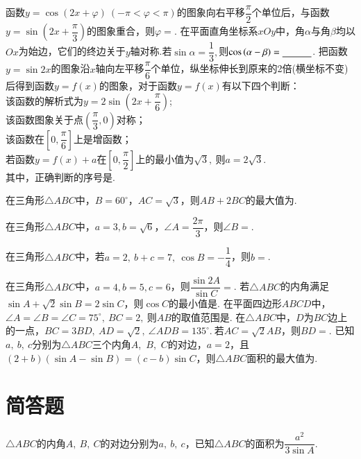 \documentclass{BHCexam}
\begin{document}
\begin{questions}
\qs 函数$y=\cos (2x+\varphi)~(-\pi<\varphi<\pi)$的图象向右平移$\dfrac{\pi}{2}$个单位后，与函数$y=\sin (2x+\dfrac{\pi}{3})$的图象重合，则$\varphi=$\tk.
\qs 在平面直角坐标系$xOy$中，角$ \alpha $与角$ \beta $均以$ Ox $为始边，它们的终边关于$y$轴对称.若$ \sin \alpha=\dfrac{1}{3}, $则$ \cos\left(\alpha-\beta\right)=\underline{\hspace{3em}} $.
\qs 把函数$ y=\sin 2x $的图象沿$x$轴向左平移$ \dfrac{\pi}{6} $个单位，纵坐标伸长到原来的2倍(横坐标不变)后得到函数$ y=f(x) $的图象，对于函数$ y=f(x) $有以下四个判断：\\
 该函数的解析式为$ y=2\sin \left(2x+\dfrac{\pi}{6}\right) $;\\
 该函数图象关于点$ \left(\dfrac{\pi}{3},0\right) $对称；\\
 该函数在$ \left[0,\dfrac{\pi}{6}\right] $上是增函数；\\
 若函数$ y=f(x)+a $在$ \left[0,\dfrac{\pi}{2}\right] $上的最小值为$ \sqrt{3},~ $则$ a=2\sqrt{3} .$\\
其中，正确判断的序号是\tk.




\qs 在三角形$\triangle ABC$中，$ B=60^{\circ} $，$ AC=\sqrt{3} $，则$ AB+2BC $的最大值为\tk.


\qs 在三角形$\triangle ABC$中，$ a=3,b=\sqrt{6} $，$ \angle A=\dfrac{2\pi}{3} $，则$ \angle B= $\tk.

\qs 在三角形$\triangle ABC$中，若$ a=2,~b+c=7,~\cos B=-\dfrac{1}{4} $，则$ b= $\tk.

\qs 在三角形$\triangle ABC$中，$ a=4,b=5,c=6 $，则$ \dfrac{\sin 2A}{\sin C}=$\tk.
\qs 若$\triangle ABC$的内角满足$ \sin A+\sqrt{2}\sin B=2\sin C $，则$ \cos C $的最小值是\tk.
\question 在平面四边形$ABCD$中，$\angle A=\angle B=\angle C=75^{\circ},~$$ BC=2,~ $则$AB$的取值范围是\tk.
\qs 在$\triangle ABC$中，$ D $为$ BC $边上的一点，$ BC=3BD,~AD=\sqrt{2},~\angle ADB=135^{\circ}.~ $若$ AC=\sqrt{2}AB $，则$ BD= $\tk.
\question 已知$a,~b,~c$分别为$\triangle ABC$三个内角$A$,~$B$,~$C$的对边，$a=2$，且$(2+b)(\sin A-\sin B)=(c-b)\sin C$，则$\triangle ABC$面积的最大值为\tk.
\section{简答题}
\qs $\triangle ABC$的内角$ A,~B,~C $的对边分别为$ a,~b,~c $，已知$ \bm{\triangle}ABC $的面积为$ \dfrac{a^2}{3\sin A} $.
\end{questions}
\end{document}
